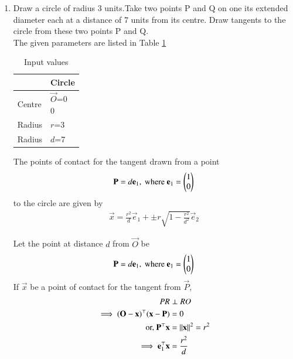 \renewcommand{\theequation}{\theenumi}
\begin{enumerate}[label=\thesubsection.\arabic*.,ref=\thesubsection.\theenumi]
%
\item 
%
Draw a circle of radius 3 units.Take two points P and Q on one its extended diameter each at a distance of 7 units from its centre. Draw tangents to the circle from these two points P and Q. 
\\
\solution The given parameters are listed in Table \ref{tab:table1}
%
\begin{table}[!ht]
\begin{center}
\begin{tabular}{ | m{2cm} | m{2cm} |} 
\hline
 & Circle \\
\hline
Centre  & $\vec{O}$=\myvec{0\\0} \\ 
\hline
Radius & $r$=3  \\ 
\hline
Radius & $d$=7  \\ 
\hline
\end{tabular}
\end{center}
\caption{Input values}
\label{tab:table1}
\end{table}
%
\begin{lemma}
  The points of contact for the tangent drawn from a point 
%
\begin{align}
  \mathbf{P} = d\mathbf{e}_1, \text{ where } \mathbf{e}_1 = \begin{pmatrix}1\\0\end{pmatrix}
  \end{align}
  to the circle are given by 
  \begin{align}
    \vec{x} = \frac{r^2}{d}\vec{e}_1 + \pm r\sqrt{1 - \frac{r^2}{d^2}} \vec{e}_2
    \label{linman/circ/contact/final}
   \end{align}
%   
\end{lemma}
Let the point at distance $d$ from $\vec{O}$ be 
%
\begin{align}
\mathbf{P} = d\mathbf{e}_1, \text{ where } \mathbf{e}_1 = \begin{pmatrix}1\\0\end{pmatrix}
\end{align}
If $\vec{x}$ be a point of contact for the tangent from $\vec{P}$, 
\begin{align}
PR &\perp RO
\\
 \implies (\vec{O}-\vec{x})^{\top} (\vec{x}-\vec{P}) &= 0
 \\
 \text{or, }  \vec{P}^{\top} \vec{x} &=\norm{\vec{x}}^2 = r^2
 \\
 \implies \vec{e}_1^{\top} \vec{x} &= \frac{r^2}{d}

\end{align}
\end{enumerate}
